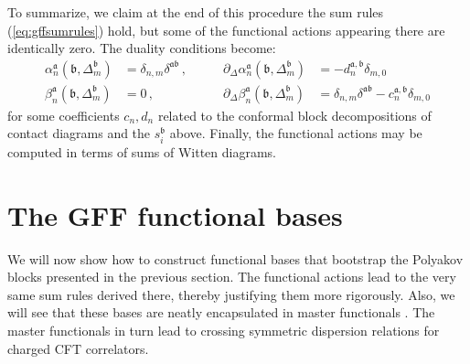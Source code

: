 \documentclass[12pt]{article}
\numberwithin{equation}{section}
\newcommand{\reef}[1]{(\ref{#1})}
\newcommand{\ba}{\begin{equation}\begin{aligned}}
\newcommand{\ea}{\end{aligned}\end{equation}}
\newcommand{\mf}[1]{\mathfrak #1}
\begin{document}
	To summarize, we claim at the end of this procedure the sum rules \reef{eq:gffsumrules} hold, but some of the functional actions appearing there are identically zero. The duality conditions become:
	\ba
	\alpha_n^{\mf a}(\mf b,\Delta_m^{\mf b})&=\delta_{n,m} \delta^{\mf a \mf b}\,,& \qquad \partial_{\Delta}  \alpha_n^{\mf a}(\mf b,\Delta_m^{\mf b})&=-d_n^{\mf a, \mf b}\delta_{m,0}\\
	\beta_n^{\mf a}(\mf b,\Delta_m^{\mf b})&=0\,,& \qquad \partial_{\Delta}  \beta_n^{\mf a}(\mf b,\Delta_m^{\mf b})&=\delta_{n,m} \delta^{\mf a \mf b}-c_n^{\mf a, \mf b}\delta_{m,0} \label{eq:dualitygff1}
	\ea
	for some coefficients $c_n, d_n$ related to the conformal block decompositions of contact diagrams and the $s_i^{\mf b}$ above. Finally, the functional actions may be computed in terms of sums of Witten diagrams.
	

	
	
	
	
	
	
	
	
	
	
	
	\section{The GFF functional bases}\label{sec:GFFfunctionals}
	
	We will now show how to construct functional bases that bootstrap the Polyakov blocks presented in the previous section. The functional actions lead to the very same sum rules derived there, thereby justifying them more rigorously. Also, we will see that these bases are neatly encapsulated in master functionals \cite{Paulos:2020zxx}. The master functionals in turn lead to crossing symmetric dispersion relations for charged CFT correlators.
		
\end{document}
